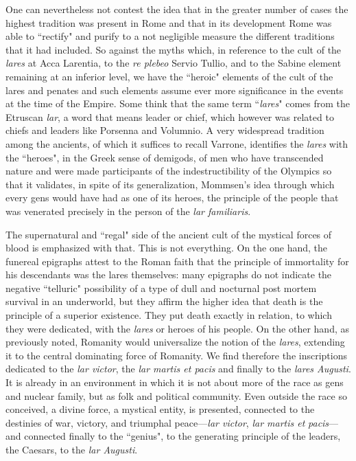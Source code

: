 One can nevertheless not contest the idea that in the greater number of cases the highest tradition was present in Rome and that in its development Rome was able to ``rectify" and purify to a not negligible measure the different traditions that it had included. So against the myths which, in reference to the cult of the \emph{lares} at Acca Larentia, to the \emph{re plebeo} Servio Tullio, and to the Sabine element remaining at an inferior level, we have the ``heroic" elements of the cult of the lares and penates and such elements assume ever more significance in the events at the time of the Empire. Some think that the same term ``\emph{lares}" comes from the Etruscan \emph{lar}, a word that means leader or chief, which however was related to chiefs and leaders like Porsenna and Volumnio. A very widespread tradition among the ancients, of which it suffices to recall Varrone, identifies the \emph{lares} with the ``heroes", in the Greek sense of demigods, of men who have transcended nature and were made participants of the indestructibility of the Olympics so that it validates, in spite of its generalization, Mommsen's idea through which every gens would have had as one of its heroes, the principle of the people that was venerated precisely in the person of the \emph{lar familiaris}.

The supernatural and ``regal" side of the ancient cult of the mystical forces of blood is emphasized with that. This is not everything. On the one hand, the funereal epigraphs attest to the Roman faith that the principle of immortality for his descendants was the lares themselves: many epigraphs do not indicate the negative ``telluric" possibility of a type of dull and nocturnal post mortem survival in an underworld, but they affirm the higher idea that death is the principle of a superior existence. They put death exactly in relation, to which they were dedicated, with the \emph{lares} or heroes of his people. On the other hand, as previously noted, Romanity would universalize the notion of the \emph{lares}, extending it to the central dominating force of Romanity. We find therefore the inscriptions dedicated to the \emph{lar victor}, the \emph{lar martis et pacis} and finally to the \emph{lares Augusti}. It is already in an environment in which it is not about more of the race as gens and nuclear family, but as folk and political community. Even outside the race so conceived, a divine force, a mystical entity, is presented, connected to the destinies of war, victory, and triumphal peace—\emph{lar victor}, \emph{lar martis et }\emph{pacis}—and connected finally to the ``genius", to the generating principle of the leaders, the Caesars, to the \emph{lar Augusti}.

